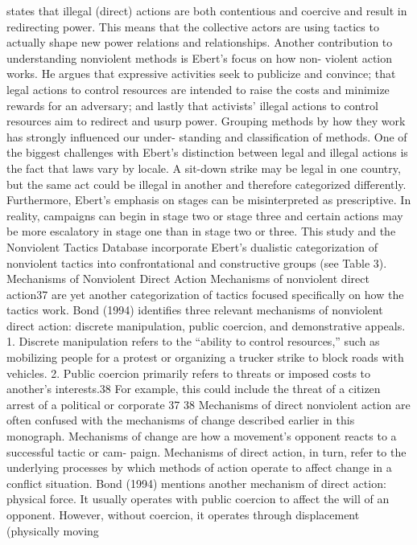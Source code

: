 \documentclass[twoside,a4paper,12pt,fleqn,openany]{extbook}
\begin{document}
states that illegal (direct) actions are both contentious and coercive and result in redirecting
power. This means that the collective actors are using tactics to actually shape new power
relations and relationships.
Another contribution to understanding nonviolent methods is Ebert’s focus on how non-
violent action works. He argues that expressive activities seek to publicize and convince;
that legal actions to control resources are intended to raise the costs and minimize rewards
for an adversary; and lastly that activists’ illegal actions to control resources aim to redirect
and usurp power. Grouping methods by how they work has strongly influenced our under-
standing and classification of methods.
One of the biggest challenges with Ebert’s distinction between legal and illegal actions
is the fact that laws vary by locale. A sit-down strike may be legal in one country, but the
same act could be illegal in another and therefore categorized differently. Furthermore,
Ebert’s emphasis on stages can be misinterpreted as prescriptive. In reality, campaigns can
begin in stage two or stage three and certain actions may be more escalatory in stage one
than in stage two or three. This study and the Nonviolent Tactics Database incorporate
Ebert’s dualistic categorization of nonviolent tactics into confrontational and constructive
groups (see Table 3).
Mechanisms of Nonviolent Direct Action
Mechanisms of nonviolent direct action37 are yet another categorization of tactics focused
specifically on how the tactics work. Bond (1994) identifies three relevant mechanisms of
nonviolent direct action: discrete manipulation, public coercion, and demonstrative appeals.
1.	Discrete manipulation refers to the “ability to control resources,” such as mobilizing
people for a protest or organizing a trucker strike to block roads with vehicles.
2.	 Public coercion primarily refers to threats or imposed costs to another’s interests.38
For example, this could include the threat of a citizen arrest of a political or corporate
37
38
Mechanisms of direct nonviolent action are often confused with the mechanisms of change described earlier in
this monograph. Mechanisms of change are how a movement’s opponent reacts to a successful tactic or cam-
paign. Mechanisms of direct action, in turn, refer to the underlying processes by which methods of action operate
to affect change in a conflict situation.
Bond (1994) mentions another mechanism of direct action: physical force. It usually operates with public coercion
to affect the will of an opponent. However, without coercion, it operates through displacement (physically moving
\end{document}

